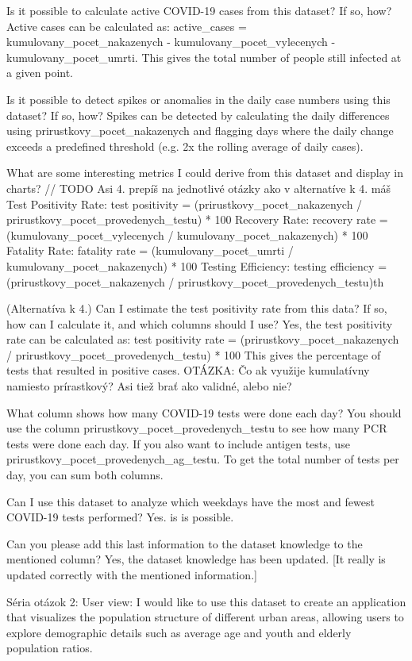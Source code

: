 Is it possible to calculate active COVID-19 cases from this dataset? If so, how?
Active cases can be calculated as: active_cases = kumulovany_pocet_nakazenych - kumulovany_pocet_vylecenych - kumulovany_pocet_umrti. This gives the total number of people still infected at a given point.

Is it possible to detect spikes or anomalies in the daily case numbers using this dataset? If so, how?
Spikes can be detected by calculating the daily differences using prirustkovy_pocet_nakazenych and flagging days where the daily change exceeds a predefined threshold (e.g. 2x the rolling average of daily cases).

What are some interesting metrics I could derive from this dataset and display in charts? // TODO Asi 4. prepíš na jednotlivé otázky ako v alternatíve k 4. máš
Test Positivity Rate: test positivity = (prirustkovy_pocet_nakazenych / prirustkovy_pocet_provedenych_testu) * 100
Recovery Rate: recovery rate = (kumulovany_pocet_vylecenych / kumulovany_pocet_nakazenych) * 100 
Fatality Rate: fatality rate = (kumulovany_pocet_umrti / kumulovany_pocet_nakazenych) * 100 
Testing Efficiency: testing efficiency = (prirustkovy_pocet_nakazenych / prirustkovy_pocet_provedenych_testu)th

(Alternatíva k 4.) Can I estimate the test positivity rate from this data? If so, how can I calculate it, and which columns should I use?
Yes, the test positivity rate can be calculated as: test positivity rate = (prirustkovy_pocet_nakazenych / prirustkovy_pocet_provedenych_testu) * 100 This gives the percentage of tests that resulted in positive cases.
OTÁZKA: Čo ak využije kumulatívny namiesto prírastkový? Asi tiež brať ako validné, alebo nie?

What column shows how many COVID-19 tests were done each day?
You should use the column prirustkovy_pocet_provedenych_testu to see how many PCR tests were done each day. If you also want to include antigen tests, use prirustkovy_pocet_provedenych_ag_testu. To get the total number of tests per day, you can sum both columns.

Can I use this dataset to analyze which weekdays have the most and fewest COVID-19 tests performed?
Yes. is is possible.

Can you please add this last information to the dataset knowledge to the mentioned column?
Yes, the dataset knowledge has been updated. [It really is updated correctly with the mentioned information.]

Séria otázok 2:
User view: I would like to use this dataset to create an application that visualizes the population structure of different urban areas, allowing users to explore demographic details such as average age and youth and elderly population ratios.

